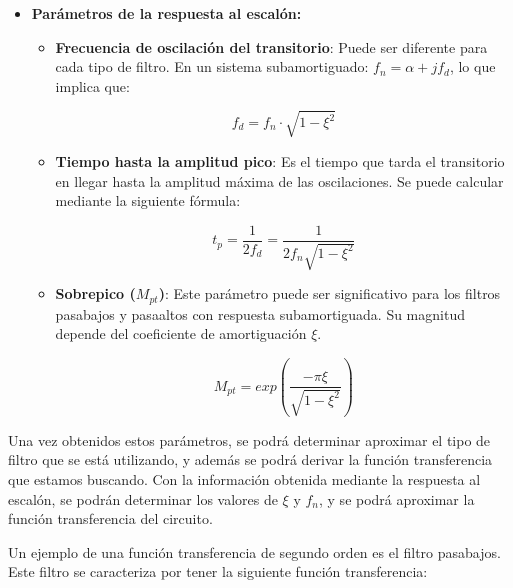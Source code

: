 \documentclass[12pt,oneside,a4paper]{article}
\begin{document}
\begin{itemize}
    \item \textbf{Parámetros de la respuesta al escalón:}
        \begin{itemize}
            \item \textbf{Frecuencia de oscilación del transitorio}: Puede ser diferente para cada tipo 
            de filtro. En un sistema subamortiguado: $f_n = \alpha + jf_d$, lo que implica que:

            \begin{equation}
                f_d = f_n \cdot \sqrt{1 - \xi^2}
            \end{equation}
            \newpage

            \item \textbf{Tiempo hasta la amplitud pico}: Es el tiempo que tarda el transitorio en 
            llegar hasta la amplitud máxima de las oscilaciones. Se puede calcular mediante la siguiente
            fórmula:

            \begin{equation}
                t_p = \frac{1}{2f_d} = \frac{1}{2 f_n \sqrt{1 - \xi^2}}
            \end{equation}

            \item \textbf{Sobrepico ($M_{pt}$)}: Este parámetro puede ser significativo para los filtros 
            pasabajos y pasaaltos con respuesta subamortiguada. Su magnitud depende del coeficiente de 
            amortiguación $\xi$.

            \begin{equation}
                M_{pt} = exp(\frac{-\pi \xi}{\sqrt{1-\xi^2}})
            \end{equation}

        \end{itemize}
\end{itemize}

Una vez obtenidos estos parámetros, se podrá determinar aproximar el tipo de filtro que se está utilizando, 
y además se podrá derivar la función transferencia que estamos buscando. Con la información obtenida 
mediante la respuesta al escalón, se podrán determinar los valores de $\xi$ y $f_n$, y se podrá 
aproximar la función transferencia del circuito.

Un ejemplo de una función transferencia de segundo orden es el filtro pasabajos. Este filtro se 
caracteriza por tener la siguiente función transferencia:
\end{document}
